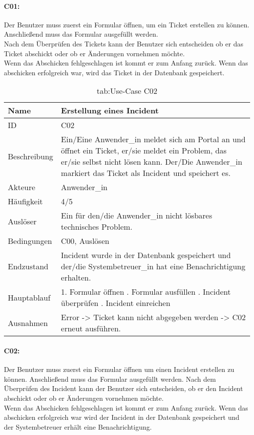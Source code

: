 \paragraph{C01:}
Der Benutzer muss zuerst ein Formular öffnen, um ein Ticket erstellen zu können. Anschließend muss das Formular ausgefüllt werden. 
\\
Nach dem Überprüfen des Tickets kann der Benutzer sich entscheiden ob er das Ticket abschickt oder ob er Änderungen vornehmen möchte. 
\\
Wenn das Abschicken fehlgeschlagen ist kommt er zum Anfang zurück. Wenn das abschicken erfolgreich war, wird das Ticket in der Datenbank gespeichert.
\newpage
\begin{table}[h]
	\begin{tabular}{|p{3cm}|p{10.7cm}|}
		\hline
		Name & Erstellung eines Incident\\
		\hline
		ID &  C02\\
		\hline
		Beschreibung & Ein/Eine Anwender\_in meldet sich am Portal an und öffnet ein Ticket, er/sie meldet ein Problem, das er/sie selbst nicht lösen kann. Der/Die Anwender\_in markiert das Ticket als Incident und speichert es.\\
		\hline
		Akteure & Anwender\_in\\
		\hline
		Häufigkeit & 4/5\\
		\hline
		Auslöser & Ein für den/die Anwender\_in nicht lösbares technisches Problem.\\
		\hline
		Bedingungen & C00, Auslösen\\
		\hline
		Endzustand & Incident wurde in der Datenbank gespeichert und der/die Systembetreuer\_in hat eine Benachrichtigung erhalten.\\
		\hline
		Hauptablauf & 1. Formular öffnen \newline2. Formular ausfüllen \newline3. Incident überprüfen \newline4. Incident einreichen\\
		\hline
		Ausnahmen & Error -> Ticket kann nicht abgegeben werden -> C02 erneut ausführen.\\
		\hline
	\end{tabular}
	\caption{tab:Use-Case C02}
\end{table}
\label{tab:tab:Use-Case C02}

\paragraph{C02:}
Der Benutzer muss zuerst ein Formular öffnen um einen Incident erstellen zu können. Anschließend muss das Formular ausgefüllt werden. Nach dem Überprüfen des Incident kann der Benutzer sich entscheiden, ob er den Incident abschickt oder ob er Änderungen vornehmen möchte.
\\
Wenn das Abschicken fehlgeschlagen ist kommt er zum Anfang zurück. Wenn das abschicken erfolgreich war wird der Incident in der Datenbank gespeichert und der Systembetreuer erhält eine Benachrichtigung.

